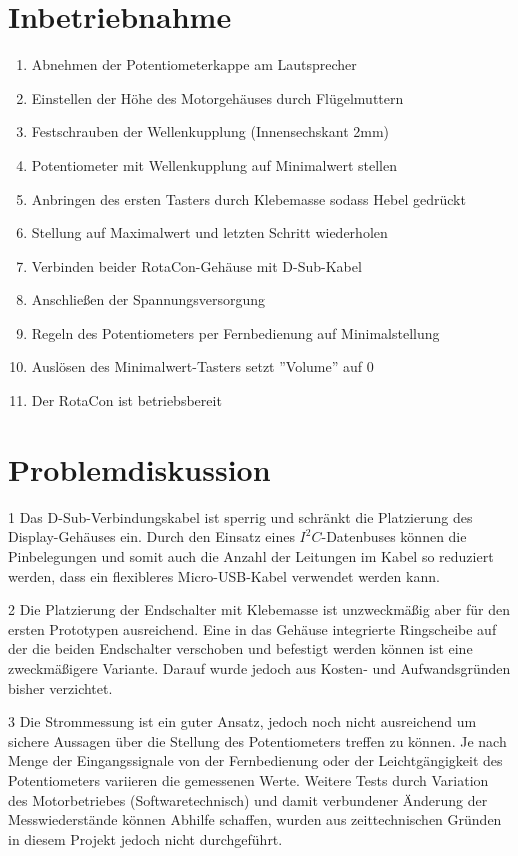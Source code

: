 \documentclass[11pt, titlepage, fleqn]{report}
\begin{document}
		\section{Inbetriebnahme}
			\label{sec:HowTo}
			\begin{enumerate}
				\item Abnehmen der Potentiometerkappe am Lautsprecher
				\item Einstellen der Höhe des Motorgehäuses durch Flügelmuttern
				\item Festschrauben der Wellenkupplung (Innensechskant 2mm)
				\item Potentiometer mit Wellenkupplung auf Minimalwert stellen
				\item Anbringen des ersten Tasters durch Klebemasse sodass Hebel gedrückt
				\item Stellung auf Maximalwert und letzten Schritt wiederholen
				\item Verbinden beider RotaCon-Gehäuse mit D-Sub-Kabel
				\item Anschließen der Spannungsversorgung
				\item Regeln des Potentiometers per Fernbedienung auf Minimalstellung
				\item Auslösen des Minimalwert-Tasters setzt ''Volume'' auf 0
				\item Der RotaCon ist betriebsbereit
			\end{enumerate}
		\section{Problemdiskussion}
		\label{sec:Probleme}
			1 Das D-Sub-Verbindungskabel ist sperrig und schränkt die Platzierung des Display-Gehäuses ein. Durch den Einsatz eines $I^{2}C$-Datenbuses können die Pinbelegungen und somit auch die Anzahl der Leitungen im Kabel so reduziert werden, dass ein flexibleres Micro-USB-Kabel verwendet werden kann.

			2 Die Platzierung der Endschalter mit Klebemasse ist unzweckmäßig aber für den ersten Prototypen ausreichend. Eine in das Gehäuse integrierte Ringscheibe auf der die beiden Endschalter verschoben und befestigt werden können ist eine zweckmäßigere Variante. Darauf wurde jedoch aus Kosten- und Aufwandsgründen bisher verzichtet.
			
			3 Die Strommessung ist ein guter Ansatz, jedoch noch nicht ausreichend um sichere Aussagen über die Stellung des Potentiometers treffen zu können. Je nach Menge der Eingangssignale von der Fernbedienung oder der Leichtgängigkeit des Potentiometers variieren die gemessenen Werte. Weitere Tests durch Variation des Motorbetriebes (Softwaretechnisch) und damit verbundener Änderung der Messwiederstände können Abhilfe schaffen, wurden aus zeittechnischen Gründen in diesem Projekt jedoch nicht durchgeführt.
\end{document}
